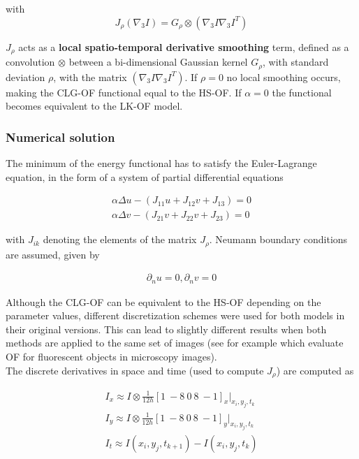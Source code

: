 \documentclass{article}
\begin{document}
with
\[ J_\rho(\nabla_3I) = G_\rho \otimes (\nabla_3I \nabla_3I^T) \]

$J_\rho$ acts as a \textbf{local spatio-temporal derivative smoothing} term, 
defined as a convolution $\otimes$ between a bi-dimensional Gaussian kernel 
$G_\rho$, with standard deviation $\rho$, with the matrix 
$(\nabla_3I \nabla_3I^T)$. If $\rho = 0$ no local smoothing occurs, making the 
CLG-OF functional equal to the HS-OF. If $\alpha = 0$ the functional becomes 
equivalent to the LK-OF model.

\label{numericalSolution}
\subsubsection{Numerical solution}

The minimum of the energy functional has to satisfy the Euler-Lagrange equation, 
in the form of a system of partial differential equations

\begin{align}
 \alpha \Delta u - (J_{11}u + J_{12}v + J_{13}) = 0 \\
 \alpha \Delta v - (J_{21}v + J_{22}v + J_{23}) = 0
\end{align}

with $J_{ik}$ denoting the elements of the matrix $J_\rho$. Neumann boundary 
conditions are assumed, given by

\begin{align}
 \partial_n u = 0, \partial_n v = 0
\label{eqn:NeumannBC}
\end{align}

Although the CLG-OF can be equivalent to the HS-OF depending on the parameter 
values, different discretization schemes were used for both models in their original 
versions. This can lead to slightly different results when both methods are applied 
to the same set of images (see for example \cite{Delpiano11,Hubeny07} 
which evaluate OF for fluorescent objects in microscopy images).\\

The discrete derivatives in space and time (used to compute $J_\rho$) are 
computed as

\begin{align}
 I_x \approx I \otimes \frac{1}{12h} [ 1 \ -8 \ 0 \ 8 \ -1 ]_x |_{x_i,y_j,t_k} \\
 I_y \approx I \otimes \frac{1}{12h} [ 1 \ -8 \ 0 \ 8 \ -1 ]_y |_{x_i,y_j,t_k} \\
 I_t \approx I(x_i, y_j, t_{k+1}) - I(x_i, y_j, t_k)
\end{align}
\end{document}
